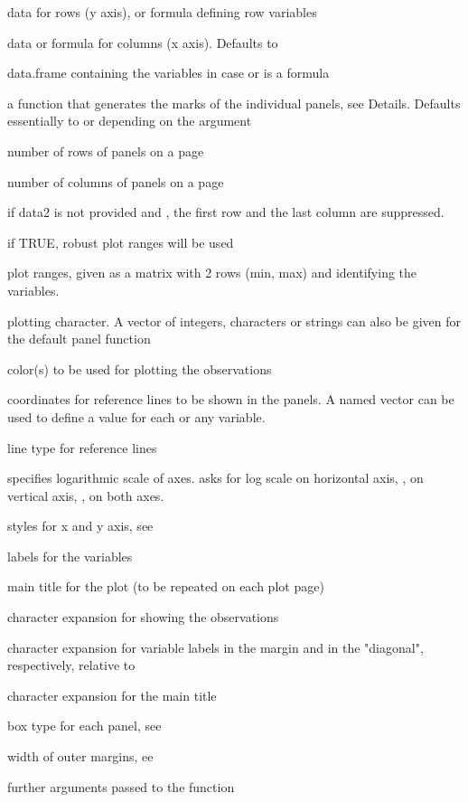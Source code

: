 \documentclass{article}
\begin{document}
\begin{Arguments}
\begin{ldescription}
\item[\code{data1}] data for rows (y axis), or formula defining row variables
\item[\code{data2}] data or formula for columns (x axis). Defaults to 
\item[\code{data}] data.frame containing the variables in case 
or  is a formula
\item[\code{panel}] a function that generates the marks of the individual
panels, see Details.
Defaults essentially to  or 
depending on the argument 
\item[\code{nrows}] number of rows of panels on a page
\item[\code{ncols}] number of columns of panels on a page
\item[\code{save}] if data2 is not provided and ,
the first row and the last column are suppressed.
\item[\code{robrange.}] if TRUE, robust plot ranges will be used
\item[\code{range.}] plot ranges, given as a matrix with 2 rows (min, max)
and  identifying the variables.
\item[\code{pch}] plotting character. A vector of integers, characters or
strings can also be given for the default panel function
\item[\code{clr}] color(s) to be used for plotting the observations
\item[\code{reference}] coordinates for reference lines to be shown in the
panels. A named vector can be used to define a value for each or
any variable.
\item[\code{ltyref}] line type for reference lines
\item[\code{log}] specifies logarithmic scale of axes.  asks for
log scale on horizontal axis, , on vertical axis,
, on both axes.
\item[\code{xaxs, yaxs}] styles for x and y axis, see 
\item[\code{vnames}] labels for the variables
\item[\code{main}] main title for the plot (to be repeated on each plot page)
\item[\code{cex}] character expansion for showing the observations
\item[\code{cexlab, cextext}] character expansion for variable labels
in the margin and in the "diagonal", respectively,
relative to 
\item[\code{cex.title}] character expansion for the main title
\item[\code{bty}] box type for each panel, see 
\item[\code{oma}] width of outer margins, ee 
\item[\code{...}] further arguments passed to the  function
\end{ldescription}
\end{Arguments}
\end{document}
